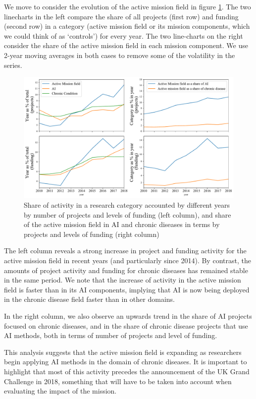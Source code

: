 \documentclass[11pt]{article}
\begin{document}
We move to consider the evolution of the active mission field in figure \ref{fig:trends}. The two linecharts in the left compare the share of all projects (first row) and funding (second row) in a category (active mission field or its mission components, which we could think of as `controls') for every year. The two line-charts on the right consider the share of the active mission field in each mission component. We use 2-year moving averages in both cases to remove some of the volatility in the series.

\begin{figure}[!ht]
    \centering
    \includegraphics[width=\textwidth]{figures/fig_7_trends.pdf}
    \caption{Share of activity in a research category accounted by different years by number of projects and levels of funding (left column), and share of the active mission field in AI and chronic diseases in terms by projects and levels of funding (right column)}
    \label{fig:trends}
\end{figure}

The left column reveals a strong increase in project and funding activity for the active mission field in recent years (and particularly since 2014). By contrast, the amounts of project activity and funding for chronic diseases has remained stable in the same period. We note that the increase of activity in the active mission field is faster than in its AI components, implying that AI is now being deployed in the chronic disease field faster than in other domains.

In the right column, we also observe an upwards trend in the share of AI projects focused on chronic diseases, and in the share of chronic disease projects that use AI methods, both in terms of number of projects and level of funding.

This analysis suggests that the active mission field is expanding as researchers begin applying AI methods in the domain of chronic diseases. It is important to highlight that most of this activity precedes the announcement of the UK Grand Challenge in 2018, something that will have to be taken into account when evaluating the impact of the mission.
\end{document}
